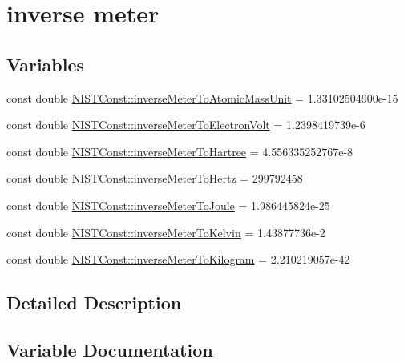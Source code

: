 \hypertarget{group___n_i_s_t_const-_inverse_meter}{}\section{inverse meter}
\label{group___n_i_s_t_const-_inverse_meter}
\subsection*{Variables}
\begin{DoxyCompactItemize}
\item 
const double \hyperlink{group___n_i_s_t_const-_inverse_meter_ga7d76b1c26bd9b6226d0bdbcbfe44c3a0}{N\+I\+S\+T\+Const\+::inverse\+Meter\+To\+Atomic\+Mass\+Unit} = 1.\+33102504900e-\/15
\item 
const double \hyperlink{group___n_i_s_t_const-_inverse_meter_gafdede27a7699d3a180bb829b65fac447}{N\+I\+S\+T\+Const\+::inverse\+Meter\+To\+Electron\+Volt} = 1.\+2398419739e-\/6
\item 
const double \hyperlink{group___n_i_s_t_const-_inverse_meter_ga6f47bdfe8997031b0f15229eb5bf4b9e}{N\+I\+S\+T\+Const\+::inverse\+Meter\+To\+Hartree} = 4.\+556335252767e-\/8
\item 
const double \hyperlink{group___n_i_s_t_const-_inverse_meter_ga5743c27316774c4f065336d0a016508e}{N\+I\+S\+T\+Const\+::inverse\+Meter\+To\+Hertz} = 299792458
\item 
const double \hyperlink{group___n_i_s_t_const-_inverse_meter_gaa927232a822dccc33f7c56ac002aff52}{N\+I\+S\+T\+Const\+::inverse\+Meter\+To\+Joule} = 1.\+986445824e-\/25
\item 
const double \hyperlink{group___n_i_s_t_const-_inverse_meter_gaf5a61f53f6757db329df597b76b2df69}{N\+I\+S\+T\+Const\+::inverse\+Meter\+To\+Kelvin} = 1.\+43877736e-\/2
\item 
const double \hyperlink{group___n_i_s_t_const-_inverse_meter_ga6b5807b2161fa29684e4862e575b9102}{N\+I\+S\+T\+Const\+::inverse\+Meter\+To\+Kilogram} = 2.\+210219057e-\/42
\end{DoxyCompactItemize}


\subsection{Detailed Description}


\subsection{Variable Documentation}
\mbox{\label{group___n_i_s_t_const-_inverse_meter_ga7d76b1c26bd9b6226d0bdbcbfe44c3a0}} 
